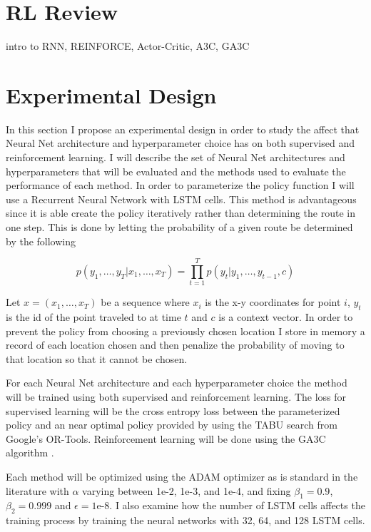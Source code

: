\documentclass[12pt]{article}
\begin{document}
\section{RL Review}
intro to RNN, REINFORCE, Actor-Critic, A3C, GA3C

\section{Experimental Design}
In this section I propose an experimental design in order to study the affect that Neural Net architecture and hyperparameter choice has on both supervised and reinforcement learning. I will describe the set of Neural Net architectures and hyperparameters that will be evaluated and the methods used to evaluate the performance of each method. In order to parameterize the policy function I will use a Recurrent Neural Network with LSTM cells. This method is advantageous since it is able create the policy iteratively rather than determining the route in one step. This is done by letting the probability of a given route be determined by the following

\begin{equation*}
  p(y_1,\dots,y_T |x_1,\dots, x_T)=\prod_{t=1}^{T}p(y_t|y_1,\dots,y_{t-1},c)
\end{equation*}

Let $x=(x_1,\dots,x_T)$ be a sequence where $x_i$ is the x-y coordinates for point $i$, $y_t$ is the id of the point traveled to at time $t$ and $c$ is a context vector. In order to prevent the policy from choosing a previously chosen location I store in memory a record of each location chosen and then penalize the probability of moving to that location so that it cannot be chosen.

For each Neural Net architecture and each hyperparameter choice the method will be trained using both supervised and reinforcement learning. The loss for supervised learning will be the cross entropy loss between the parameterized policy and an near optimal policy provided by using the TABU search from Google's OR-Tools. Reinforcement learning will be done using the GA3C algorithm \citet{2016_ga3c}.

Each method will be optimized using the ADAM optimizer as is standard in the literature with $\alpha$ varying between 1e-2, 1e-3, and 1e-4, and fixing $\beta_1=0.9$, $\beta_2=0.999$ and $\epsilon=\text{1e-8}$. I also examine how the number of LSTM cells affects the training process by training the neural networks with 32, 64, and 128 LSTM cells.
\end{document}

